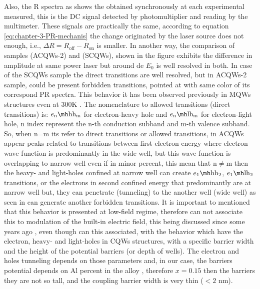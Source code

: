 Also, the \gls{R} spectra as shows the   obtained synchronously at each experimental measured, this is the DC signal detected by photomultiplier and reading by the multimeter. These signals are practically the same, according to equation \cref{eq:chapter-3-PR-mechanis}  the change originated by the laser source does not enough, i.e., $\Delta R= R_{\mathrm{off}}- R_{\mathrm{on}}$ is smaller. 
In another way, the comparison of samples  (ACQWs-2) and  (SCQWs), shown in the figure  exhibits the difference in amplitude at same power laser but around de $E_0$ is well resolved in both. In case of the SCQWs sample  the direct transitions are well resolved, but in ACQWs-2 sample, could be present forbidden transitions, pointed at  with same color of its correspond PR spectra. This behavior it has been observed previously\cite{fox1991excitonic} in MQWs structures even at 300K \cite{shen1986observation}. The nomenclature to allowed transitions  (direct transitions) is: $\thh{\text{n}}{\text{m}}$ for electron-heavy hole and  $\tlh{\text{n}}{\text{m}}$ for electron-light hole, n index represent the n-th conduction subband and m-th  valence subband. So, when n=m its refer to direct transitions or allowed transitions, in ACQWs appear peaks related to transitions between first electron energy where electron wave function is predominantly in the wide well, but this wave function is overlapping to narrow well even if in minor percent, this mean that $\mathrm{n\neq m} $ then the heavy- and light-holes confined at narrow well can create $\thh{1}{2}$,  $\tlh{1}{2}$ transitions, or the electrons in second confined energy that  predominantly  are at narrow well but, they can penetrate (tunneling)   to the  another well (wide well) as seen in     can generate  another forbidden transitions. 
It is important to mentioned that this behavior is presented at low-field regime, therefore can not associate this to modulation of the built-in electric field, this being discussed since some years ago \cite{shen1986observation,shen1987photoreflectance}, even though can this associated, with the behavior which have the  electron, heavy- and light-holes in CQWs structures, with a specific barrier width and the height of the potential barriers  (or depth of wells)\cite{fang1988allowed,sivalertporn2016effectofbarrier}. The electron and holes tunneling depends on those parameters and, in our case, the barriers potential depends on Al percent in the alloy \algaas, therefore $x=0.15$ then the barriers they are not so tall, and the coupling barrier width is very thin ($< 2$ nm). \\
